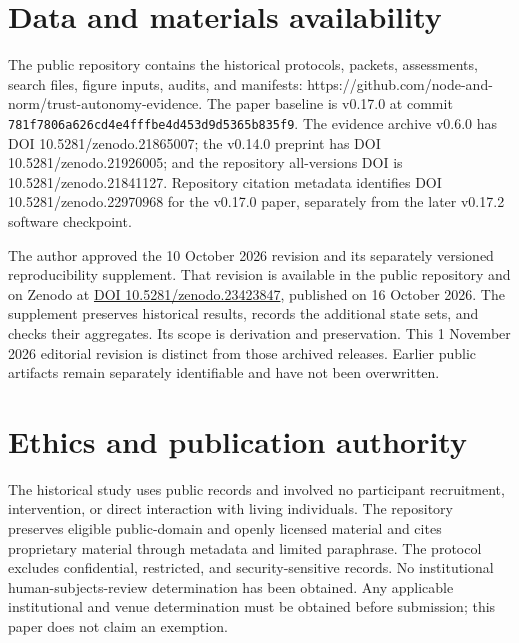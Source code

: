 \documentclass[11pt]{article}
\begin{document}
\section*{Data and materials availability}

The public repository contains the historical protocols, packets, assessments, search files, figure inputs, audits, and manifests: https://github.com/node-and-norm/trust-autonomy-evidence. The paper baseline is v0.17.0 at commit \texttt{781f7806\allowbreak{}a626cd4e\allowbreak{}4fffbe4d\allowbreak{}453d9d53\allowbreak{}65b835f9}. The evidence archive v0.6.0 has DOI 10.5281/zenodo.21865007; the v0.14.0 preprint has DOI 10.5281/zenodo.21926005; and the repository all-versions DOI is 10.5281/zenodo.21841127. Repository citation metadata identifies DOI 10.5281/zenodo.22970968 for the v0.17.0 paper, separately from the later v0.17.2 software checkpoint.

The author approved the 10 October 2026 revision and its separately versioned reproducibility supplement. That revision is available in the public repository and on Zenodo at \href{https://doi.org/10.5281/zenodo.23423847}{DOI 10.5281/zenodo.23423847}, published on 16 October 2026. The supplement preserves historical results, records the additional state sets, and checks their aggregates. Its scope is derivation and preservation. This 1 November 2026 editorial revision is distinct from those archived releases. Earlier public artifacts remain separately identifiable and have not been overwritten.

\section*{Ethics and publication authority}

The historical study uses public records and involved no participant recruitment, intervention, or direct interaction with living individuals. The repository preserves eligible public-domain and openly licensed material and cites proprietary material through metadata and limited paraphrase. The protocol excludes confidential, restricted, and security-sensitive records. No institutional human-subjects-review determination has been obtained. Any applicable institutional and venue determination must be obtained before submission; this paper does not claim an exemption.
\end{document}
